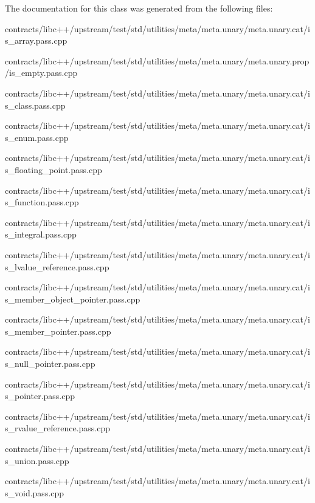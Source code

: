 The documentation for this class was generated from the following files\+:\begin{DoxyCompactItemize}
\item 
contracts/libc++/upstream/test/std/utilities/meta/meta.\+unary/meta.\+unary.\+cat/is\+\_\+array.\+pass.\+cpp\item 
contracts/libc++/upstream/test/std/utilities/meta/meta.\+unary/meta.\+unary.\+prop/is\+\_\+empty.\+pass.\+cpp\item 
contracts/libc++/upstream/test/std/utilities/meta/meta.\+unary/meta.\+unary.\+cat/is\+\_\+class.\+pass.\+cpp\item 
contracts/libc++/upstream/test/std/utilities/meta/meta.\+unary/meta.\+unary.\+cat/is\+\_\+enum.\+pass.\+cpp\item 
contracts/libc++/upstream/test/std/utilities/meta/meta.\+unary/meta.\+unary.\+cat/is\+\_\+floating\+\_\+point.\+pass.\+cpp\item 
contracts/libc++/upstream/test/std/utilities/meta/meta.\+unary/meta.\+unary.\+cat/is\+\_\+function.\+pass.\+cpp\item 
contracts/libc++/upstream/test/std/utilities/meta/meta.\+unary/meta.\+unary.\+cat/is\+\_\+integral.\+pass.\+cpp\item 
contracts/libc++/upstream/test/std/utilities/meta/meta.\+unary/meta.\+unary.\+cat/is\+\_\+lvalue\+\_\+reference.\+pass.\+cpp\item 
contracts/libc++/upstream/test/std/utilities/meta/meta.\+unary/meta.\+unary.\+cat/is\+\_\+member\+\_\+object\+\_\+pointer.\+pass.\+cpp\item 
contracts/libc++/upstream/test/std/utilities/meta/meta.\+unary/meta.\+unary.\+cat/is\+\_\+member\+\_\+pointer.\+pass.\+cpp\item 
contracts/libc++/upstream/test/std/utilities/meta/meta.\+unary/meta.\+unary.\+cat/is\+\_\+null\+\_\+pointer.\+pass.\+cpp\item 
contracts/libc++/upstream/test/std/utilities/meta/meta.\+unary/meta.\+unary.\+cat/is\+\_\+pointer.\+pass.\+cpp\item 
contracts/libc++/upstream/test/std/utilities/meta/meta.\+unary/meta.\+unary.\+cat/is\+\_\+rvalue\+\_\+reference.\+pass.\+cpp\item 
contracts/libc++/upstream/test/std/utilities/meta/meta.\+unary/meta.\+unary.\+cat/is\+\_\+union.\+pass.\+cpp\item 
contracts/libc++/upstream/test/std/utilities/meta/meta.\+unary/meta.\+unary.\+cat/is\+\_\+void.\+pass.\+cpp\item 

\end{DoxyCompactItemize}
